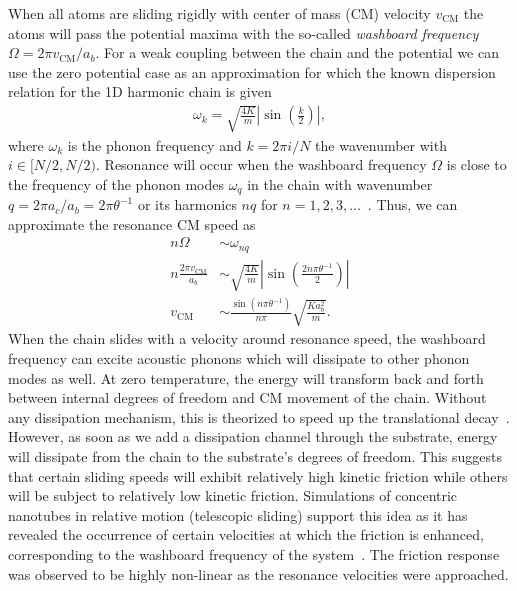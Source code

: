 When all atoms are sliding rigidly with center of mass (\acrshort{CM}) velocity $v_{{\text{CM}}}$ the atoms will pass the potential maxima with the so-called \textit{washboard frequency} $\Omega = 2\pi v_{{\text{CM}}} / a_b$. For a weak coupling between the chain and the potential we can use the zero potential case as an approximation for which the known dispersion relation for the 1D harmonic chain is given~\cite[p. 92]{Kittel2004}
\begin{align*}
  \omega_k = \sqrt{\frac{4 K}{m}} \left|\sin{\left(\frac{k}{2}\right)}\right|,
\end{align*}
where $\omega_k$ is the phonon frequency and $k = 2\pi i / N$ the wavenumber with $i\in [N/2, N/2)$. Resonance will occur when the washboard frequency $\Omega$ is close to the frequency of the phonon modes $\omega_q$ in the chain with wavenumber $q = 2\pi a_c / a_b = 2\pi \theta^{-1}$ or its harmonics $nq$ for $n = 1, 2, 3, \hdots$~\cite{van_den_Ende_2012}. Thus, we can approximate the resonance \acrshort{CM} speed as
\begin{align*}
    n \Omega &\sim \omega_{nq} \\
    n \frac{2\pi v_{\text{CM}}}{a_b} &\sim \sqrt{\frac{4K}{m}} \left| \sin{\left(\frac{2n \pi \theta^{-1}}{2}\right)}\right| \\
    v_{\text{CM}} &\sim \frac{\sin{(n\pi \theta^{-1})}}{n \pi} \sqrt{\frac{Ka_b^2}{m}}.
\end{align*}
When the chain slides with a velocity around resonance speed, the washboard
frequency can excite acoustic phonons which will dissipate to other phonon modes
as well. At zero temperature, the energy will transform back and forth between
internal degrees of freedom and \acrshort{CM} movement of the chain. Without any dissipation mechanism, this is theorized to speed up the translational decay~\cite{FK2D}. However, as soon as we add a dissipation channel through the substrate, energy will dissipate from the chain to the substrate's degrees of freedom. This suggests that certain sliding speeds will exhibit relatively high kinetic friction while
others will be subject to relatively low kinetic friction. Simulations of
concentric nanotubes in relative motion (telescopic sliding) support this idea
as it has revealed the occurrence of certain velocities at which the friction is
enhanced, corresponding to the washboard frequency of the
system~\cite{Zhang_2007, Zhang_2009}. The friction response was observed to be highly non-linear as the resonance velocities were approached. 

